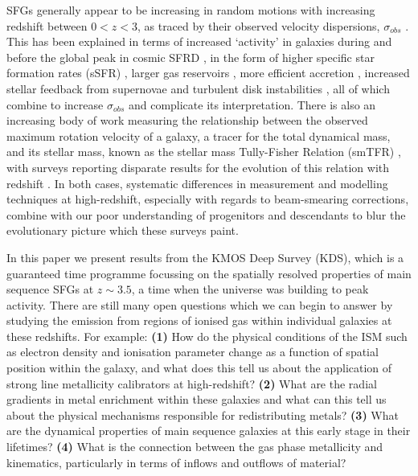 \documentclass[fleqn,usenatbib]{mn2e}
\begin{document}
SFGs generally appear to be increasing in random motions with increasing redshift between $0 < z < 3$, as traced by their observed velocity dispersions, $\sigma_{obs}$ \citep{Genzel2008,ForsterSchreiber2009,Law2009,Cresci2009,Gnerucci2011,Epinat2012,Kassin2012,Green2014,Wisnioski2015,Stott2016}.
This has been explained in terms of increased `activity' in galaxies during and before the global peak in cosmic SFRD \citep{Madau_2014}, in the form of higher specific star formation rates (sSFR) \citep{Wisnioski2015}, larger gas reservoirs \citep{Law2009,ForsterSchreiber2009,Wisnioski2015,Stott2016}, more efficient accretion \citep{Law2009}, increased stellar feedback from supernovae \citep{Kassin2012} and turbulent disk instabilities \citep{Law2009,Bournaud2007,Bournaud2016}, all of which combine to increase $\sigma_{obs}$ and complicate its interpretation.
There is also an increasing body of work measuring the relationship between the observed maximum rotation velocity of a galaxy, a tracer for the total dynamical mass, and its stellar mass, known as the stellar mass Tully-Fisher Relation (smTFR) \citep{Tully1977}, with surveys reporting disparate results for the evolution of this relation with redshift \citep[e.g.][]{Puech2008,Miller2011,Gnerucci2011,Swinbank2012,Tiley2016a,Harrison2017}.
In both cases, systematic differences in measurement and modelling techniques at high-redshift, especially with regards to beam-smearing corrections, combine with our poor understanding of progenitors and descendants to blur the evolutionary picture which these surveys paint.

In this paper we present results from the KMOS Deep Survey (KDS), which is a guaranteed time programme focussing on the spatially resolved properties of main sequence SFGs at $z\sim3.5$, a time when the universe was building to peak activity.
There are still many open questions which we can begin to answer by studying the emission from regions of ionised gas within individual galaxies at these redshifts.
For example: \textbf{(1)} How do the physical conditions of the ISM such as electron density and ionisation parameter change as a function of spatial position within the galaxy, and what does this tell us about the application of strong line metallicity calibrators at high-redshift?
\textbf{(2)} What are the radial gradients in metal enrichment within these galaxies and what can this tell us about the physical mechanisms responsible for redistributing metals?
\textbf{(3)} What are the dynamical properties of main sequence galaxies at this early stage in their lifetimes? 
\textbf{(4)} What is the connection between the gas phase metallicity and  kinematics, particularly in terms of inflows and outflows of material?
\end{document}
